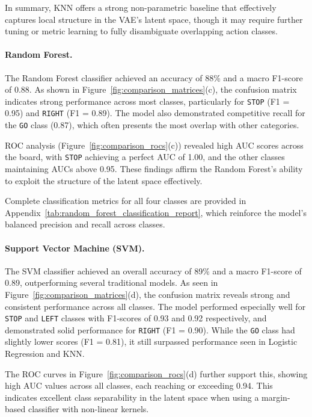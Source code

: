 In summary, KNN offers a strong non-parametric baseline that effectively captures local structure in the VAE's latent space, though it may require further tuning or metric learning to fully disambiguate overlapping action classes.


\paragraph{Random Forest.}
The Random Forest classifier achieved an accuracy of 88\% and a macro F1-score of 0.88. As shown in Figure~\ref{fig:comparison_matrices}(c), the confusion matrix indicates strong performance across most classes, particularly for \texttt{STOP} (F1 = 0.95) and \texttt{RIGHT} (F1 = 0.89). The model also demonstrated competitive recall for the \texttt{GO} class (0.87), which often presents the most overlap with other categories.

ROC analysis (Figure~\ref{fig:comparison_rocs}(c)) revealed high AUC scores across the board, with \texttt{STOP} achieving a perfect AUC of 1.00, and the other classes maintaining AUCs above 0.95. These findings affirm the Random Forest’s ability to exploit the structure of the latent space effectively.

Complete classification metrics for all four classes are provided in Appendix~\ref{tab:random_forest_classification_report}, which reinforce the model’s balanced precision and recall across classes.

\paragraph{Support Vector Machine (SVM).}
The SVM classifier achieved an overall accuracy of 89\% and a macro F1-score of 0.89, outperforming several traditional models. As seen in Figure~\ref{fig:comparison_matrices}(d), the confusion matrix reveals strong and consistent performance across all classes. The model performed especially well for \texttt{STOP} and \texttt{LEFT} classes with F1-scores of 0.93 and 0.92 respectively, and demonstrated solid performance for \texttt{RIGHT} (F1 = 0.90). While the \texttt{GO} class had slightly lower scores (F1 = 0.81), it still surpassed performance seen in Logistic Regression and KNN.

The ROC curves in Figure~\ref{fig:comparison_rocs}(d) further support this, showing high AUC values across all classes, each reaching or exceeding 0.94. This indicates excellent class separability in the latent space when using a margin-based classifier with non-linear kernels.

